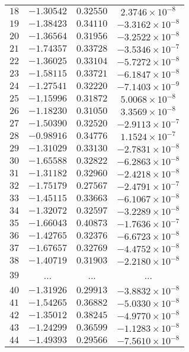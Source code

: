\begin{center}
\begin{longtable}{lccc}
$18$ & $-1.30542$ & $ 0.32550$ & $2.3746\times{}10^{-8}$ \\
$19$ & $-1.38423$ & $ 0.34110$ & $-3.3162\times{}10^{-8}$ \\
$20$ & $-1.36564$ & $ 0.31956$ & $-3.2522\times{}10^{-8}$ \\
$21$ & $-1.74357$ & $ 0.33728$ & $-3.5346\times{}10^{-7}$ \\
$22$ & $-1.36025$ & $ 0.33104$ & $-5.7272\times{}10^{-8}$ \\
$23$ & $-1.58115$ & $ 0.33721$ & $-6.1847\times{}10^{-8}$ \\
$24$ & $-1.27541$ & $ 0.32220$ & $-7.1403\times{}10^{-9}$ \\
$25$ & $-1.15996$ & $ 0.31872$ & $5.0068\times{}10^{-8}$ \\
$26$ & $-1.18230$ & $ 0.31050$ & $3.3569\times{}10^{-8}$ \\
$27$ & $-1.50390$ & $ 0.32520$ & $-2.9113\times{}10^{-7}$ \\
$28$ & $-0.98916$ & $ 0.34776$ & $1.1524\times{}10^{-7}$ \\
$29$ & $-1.31029$ & $ 0.33130$ & $-2.7831\times{}10^{-8}$ \\
$30$ & $-1.65588$ & $ 0.32822$ & $-6.2863\times{}10^{-8}$ \\
$31$ & $-1.31182$ & $ 0.32960$ & $-2.4218\times{}10^{-8}$ \\
$32$ & $-1.75179$ & $ 0.27567$ & $-2.4791\times{}10^{-7}$ \\
$33$ & $-1.45115$ & $ 0.33663$ & $-6.1067\times{}10^{-8}$ \\
$34$ & $-1.32072$ & $ 0.32597$ & $-3.2289\times{}10^{-8}$ \\
$35$ & $-1.66043$ & $ 0.40873$ & $-1.7636\times{}10^{-7}$ \\
$36$ & $-1.42765$ & $ 0.32376$ & $-6.6723\times{}10^{-8}$ \\
$37$ & $-1.67657$ & $ 0.32769$ & $-4.4752\times{}10^{-8}$ \\
$38$ & $-1.40719$ & $ 0.31903$ & $-2.2180\times{}10^{-8}$ \\
$39$ & ... & ... & ...\\
$40$ & $-1.31926$ & $ 0.29913$ & $-3.8832\times{}10^{-8}$ \\
$41$ & $-1.54265$ & $ 0.36882$ & $-5.0330\times{}10^{-8}$ \\
$42$ & $-1.35012$ & $ 0.38245$ & $-4.9770\times{}10^{-8}$ \\
$43$ & $-1.24299$ & $ 0.36599$ & $-1.1283\times{}10^{-8}$ \\
$44$ & $-1.49393$ & $ 0.29566$ & $-7.5610\times{}10^{-8}$ \\

\end{longtable}
\end{center}
